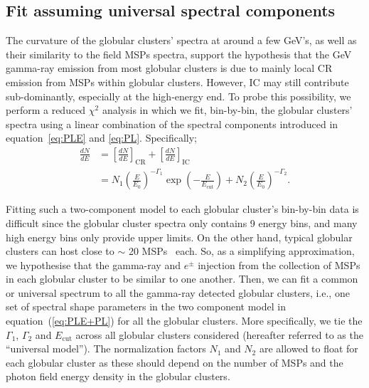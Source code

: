 \documentclass[doublespace,nopageskip]{VTthesis}
\begin{document}
\subsection{Fit assuming universal spectral components}\label{sec:spectra_global}

The curvature of the globular clusters' spectra at around a few GeV's, as well as their similarity to the field MSPs spectra, support the hypothesis that the GeV gamma-ray emission from most globular clusters is due to mainly local CR emission from MSPs within globular clusters. However, IC may still contribute sub-dominantly, especially at the high-energy end. To probe this possibility, we perform a reduced $\chi^2$ analysis in which we fit, bin-by-bin, the  globular clusters' spectra using a linear combination of the spectral components introduced in equation~\ref{eq:PLE} and \ref{eq:PL}. Specifically;
\begin{align}\label{eq:PLE+PL}
    \frac{dN}{dE} &= \left[ \frac{dN}{dE} \right]_\mathrm{CR} + \left[ \frac{dN}{dE} \right]_\mathrm{IC} \\\nonumber
    &= N_1\left( \frac{E}{E_0} \right)^{-\Gamma_1}\exp\left(-\frac{E}{E_\mathrm{cut}}\right) + N_2\left(\frac{E}{E_0}\right)^{-\Gamma_2}.
\end{align}

Fitting such a two-component model to each globular cluster's bin-by-bin data is difficult since the globular cluster spectra only contains 9 energy bins, and many high energy bins only provide upper limits. On the other hand, typical globular clusters can host close to $\sim$ 20 MSPs~\citep{2019ApJ...877..122Y} each. So, as a simplifying approximation, we hypothesise that the gamma-ray and $e^\pm$ injection from the collection of MSPs in each globular cluster to be similar to one another. Then, we can fit a common or universal spectrum to all the gamma-ray detected globular clusters, i.e., one set of spectral shape parameters in the two component model in equation~(\ref{eq:PLE+PL}) for all the globular clusters. More specifically, we tie the $\Gamma_1$, $\Gamma_2$ and $E_\mathrm{cut}$ across all globular clusters considered (hereafter referred to as the ``universal model''). The normalization factors $N_1$ and $N_2$ are allowed to float for each globular cluster as these should depend on the number of MSPs and the photon field energy density in the globular clusters.
\end{document}
